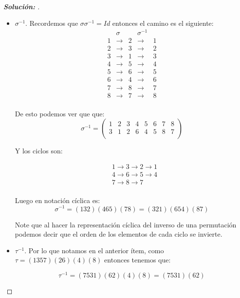 \documentclass[12pt]{article}
\begin{document}
\begin{enumerate}
\begin{proof}[\textbf{Solución: }]
\begin{itemize}
       \item $\sigma^{-1}$. Recordemos que $\sigma\sigma^{-1}=Id$ entonces el camino es el siguiente:
       $$\begin{matrix}
              &\sigma& &\sigma^{-1}& \\
            1 &\to &2&\to   &1\\
            2 &\to &3&\to   &2\\
            3 &\to &1&\to   &3\\
            4 &\to &5&\to   &4\\
            5 &\to &6&\to   &5\\
            6 &\to &4&\to   &6\\
            7 &\to &8&\to   &7\\
            8 &\to &7&\to   &8\\
        \end{matrix}$$

        De esto podemos ver que que:
        $$
        \sigma^{-1}=\begin{pmatrix}
         1 & 2 & 3 & 4 & 5 & 6 & 7 & 8\\
         3 & 1 & 2 & 6 & 4 & 5 & 8 & 7 \\
        \end{pmatrix}$$

    Y los ciclos son:

    \begin{align*}
        &1\to3\to2\to1\\
        &4\to6\to5\to4\\
        &7\to8\to7\\
    \end{align*}

    Luego en notación cíclica es:
    $$\sigma^{-1}=(132)(465)(78)=(321)(654)(87)$$

    Note que al hacer la representación cíclica del inverso de una permutación podemos decir que el orden de los elementos de cada ciclo se invierte.

    \item $\tau^{-1}$. Por lo que notamos en el anterior ítem, como $\tau=(1357)(26)(4)(8)$ entonces tenemos que:

    $$\tau^{-1}=(7531)(62)(4)(8)=(7531)(62)$$ 
    \end{itemize}
    \end{proof}


\end{enumerate}
\end{document}
